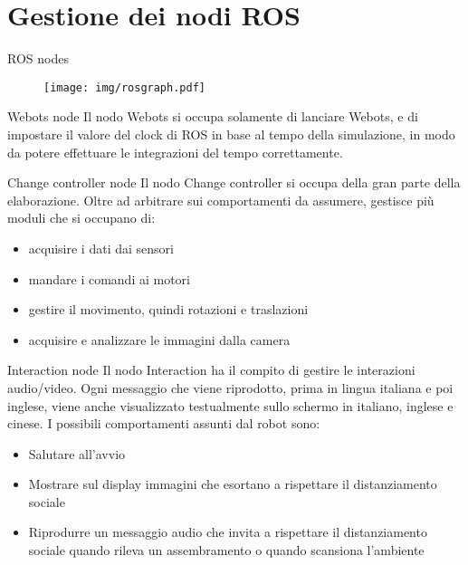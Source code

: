 \documentclass[aspectratio=169, leqno]{beamer}
\begin{document}
	\section{Gestione dei nodi ROS}\label{sec:Ros}
	\frame{\sectionpage}

	\begin{frame}{ROS nodes}
		\begin{figure}[H]
		\centering
		\texttt{[image: img/rosgraph.pdf]}
		\label{fig:rosgraph}
	\end{figure}
	\end{frame}

	\begin{frame}{Webots node}
	Il nodo Webots si occupa solamente di lanciare Webots, e di impostare il
	valore del clock di ROS in base al tempo della simulazione, in modo da
	potere effettuare le integrazioni del tempo correttamente.
	\end{frame}
	\begin{frame}{Change controller node}
	Il nodo Change controller si occupa della gran parte della elaborazione. Oltre
	ad arbitrare sui comportamenti da assumere, gestisce più moduli che si
	occupano di: 
	\begin{itemize}
		\pause\item acquisire i dati dai sensori
		\pause\item mandare i comandi ai motori
		\pause\item gestire il movimento, quindi rotazioni e traslazioni
		\pause\item acquisire e analizzare le immagini dalla camera
	\end{itemize}
	\end{frame}

	\begin{frame}{Interaction node}
	Il nodo Interaction ha il compito di gestire le interazioni audio/video. Ogni
	messaggio che viene riprodotto, prima in lingua italiana e poi inglese,
	viene anche visualizzato testualmente sullo schermo in italiano, inglese e
	cinese.  I possibili comportamenti assunti dal robot sono:
	\begin{itemize}
		\justifying
		\pause\item Salutare all'avvio
		\pause\item Mostrare sul display immagini che esortano a rispettare il
			distanziamento sociale
		\pause\item Riprodurre un messaggio audio che invita a rispettare il distanziamento sociale quando
			rileva un assembramento o quando scansiona l'ambiente
	\end{itemize}
	\end{frame}
\end{document}
